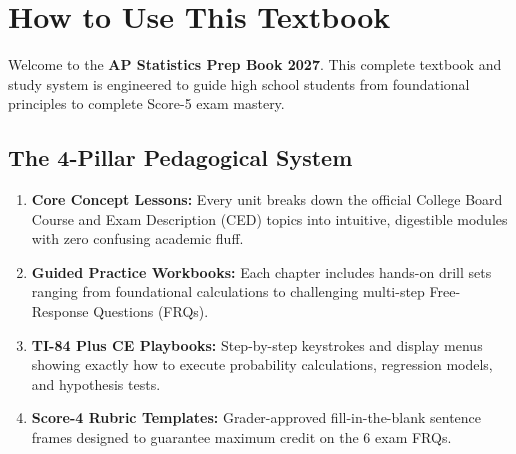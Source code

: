 \documentclass[11pt,oneside,openany]{book}
\begin{document}
\tableofcontents
\clearpage

\chapter*{How to Use This Textbook}

Welcome to the \textbf{AP Statistics Prep Book 2027}. This complete textbook and study system is engineered to guide high school students from foundational principles to complete Score-5 exam mastery.

\section*{The 4-Pillar Pedagogical System}
\begin{enumerate}[leftmargin=1.5em]
  \item \textbf{Core Concept Lessons:} Every unit breaks down the official College Board Course and Exam Description (CED) topics into intuitive, digestible modules with zero confusing academic fluff.
  \item \textbf{Guided Practice Workbooks:} Each chapter includes hands-on drill sets ranging from foundational calculations to challenging multi-step Free-Response Questions (FRQs).
  \item \textbf{TI-84 Plus CE Playbooks:} Step-by-step keystrokes and display menus showing exactly how to execute probability calculations, regression models, and hypothesis tests.
  \item \textbf{Score-4 Rubric Templates:} Grader-approved fill-in-the-blank sentence frames designed to guarantee maximum credit on the 6 exam FRQs.
\end{enumerate}
\end{document}
